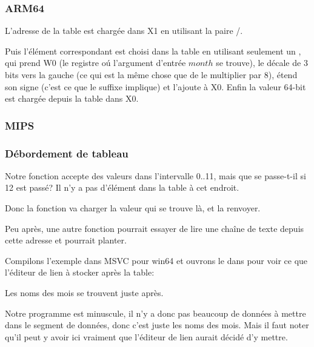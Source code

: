 \subsubsection{ARM64}




L'adresse de la table est chargée dans X1 en utilisant la paire \ADRP/\ADD.

Puis l'élément correspondant est choisi dans la table en utilisant seulement un \LDR,
qui prend W0 (le registre oú l'argument d'entrée $month$ se trouve), le décale de
3 bits vers la gauche (ce qui est la même chose que de le multiplier par 8), étend
son signe (c'est ce que le suffixe  implique) et l'ajoute à X0.
Enfin la valeur 64-bit est chargée depuis la table dans X0.

\subsubsection{MIPS}



\subsubsection{Débordement de tableau}

Notre fonction accepte des valeurs dans l'intervalle 0..11, mais que se passe-t-il
si 12 est passé?
Il n'y a pas d'élément dans la table à cet endroit.

Donc la fonction va charger la valeur qui se trouve là, et la renvoyer.

Peu après, une autre fonction pourrait essayer de lire une chaîne de texte depuis
cette adresse et pourrait planter.

Compilons l'exemple dans MSVC pour win64 et ouvrons le dans \IDA pour voir ce que
l'éditeur de lien à stocker après la table:



Les noms des mois se trouvent juste après.

Notre programme est minuscule, il n'y a donc pas beaucoup de données à mettre dans
le segment de données, donc c'est juste les noms des mois.
Mais il faut noter qu'il peut y avoir ici vraiment  que l'éditeur
de lien aurait décidé d'y mettre.

